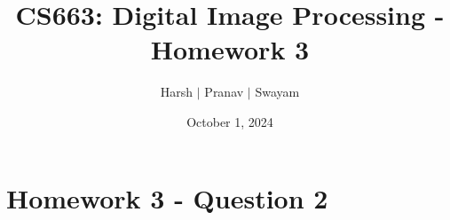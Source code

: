 \documentclass{article}
\title{CS663: Digital Image Processing - Homework 3}
\author{Harsh $\vert$ Pranav $\vert$ Swayam}
\date{October 1, 2024}
\begin{document}
\maketitle
\section{Homework 3 - Question 2}
\end{document}

